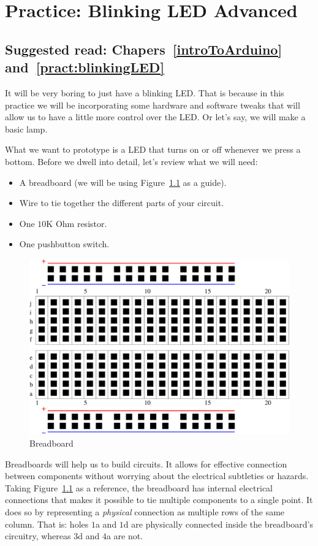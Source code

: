 \chapter{Practice: Blinking LED Advanced}\label{pract:blinkingLEDAdvanced}
\section*{Suggested read: Chapers~\ref{introToArduino} and~\ref{pract:blinkingLED}}

It will be very boring to just have a blinking LED. That is because in this practice we will be incorporating some hardware and software tweaks that will allow us to have a little more control over the LED. Or let's say, we will make a basic lamp.

What we want to prototype is a LED that turns on or off whenever we press a bottom. Before we dwell into detail, let's review what we will need:

\begin{itemize}
	\item A breadboard (we will be using Figure~\ref{fig:breadboard} as a guide).
	\item Wire to tie together the different parts of your circuit.
	\item One $10$K Ohm resistor.
	\item One pushbutton switch.	
\end{itemize}

\begin{figure}[htbp]
  \centering
  \includegraphics[width=0.7\linewidth]{figures/breadboard.eps}
  \caption{Breadboard
  \label{fig:breadboard}}
\end{figure}

Breadboards will help us to build circuits. It allows for effective connection between components without worrying about the electrical subtleties or hazards. Taking Figure~\ref{fig:breadboard} as a reference, the breadboard has internal electrical connections that makes it possible to tie multiple components to a single point. It does so by representing a \emph{physical} connection as multiple rows of the same column. That is: holes $1$a and $1$d are physically connected inside the breadboard's circuitry, whereas $3$d and $4$a are not.

